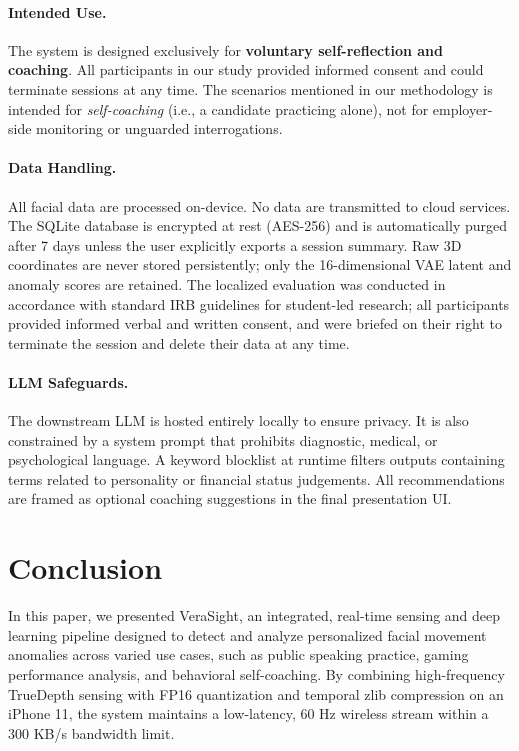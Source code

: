 \documentclass[sigconf]{acmart}
\begin{document}
\paragraph{Intended Use.}
The system is designed exclusively for \textbf{voluntary self-reflection and coaching}. All participants in our study provided informed consent and could terminate sessions at any time. The scenarios mentioned in our methodology is intended for \emph{self-coaching} (i.e., a candidate practicing alone), not for employer-side monitoring or unguarded interrogations.

\paragraph{Data Handling.}
All facial data are processed on-device. No data are transmitted to cloud services. The SQLite database is encrypted at rest (AES-256) and is automatically purged after 7 days unless the user explicitly exports a session summary. Raw 3D coordinates are never stored persistently; only the 16-dimensional VAE latent and anomaly scores are retained. The localized evaluation was conducted in accordance with standard IRB guidelines for student-led research; all participants provided informed verbal and written consent, and were briefed on their right to terminate the session and delete their data at any time.

\paragraph{LLM Safeguards.}
The downstream LLM is hosted entirely locally to ensure privacy. It is also constrained by a system prompt that prohibits diagnostic, medical, or psychological language. A keyword blocklist at runtime filters outputs containing terms related to personality or financial status judgements. All recommendations are framed as optional coaching suggestions in the final presentation UI.

\section{Conclusion}

In this paper, we presented VeraSight, an integrated, real-time sensing and deep learning pipeline designed to detect and analyze personalized facial movement anomalies across varied use cases, such as public speaking practice, gaming performance analysis, and behavioral self-coaching. By combining high-frequency TrueDepth sensing with FP16 quantization and temporal zlib compression on an iPhone 11, the system maintains a low-latency, 60 Hz wireless stream within a 300 KB/s bandwidth limit. 
\end{document}
